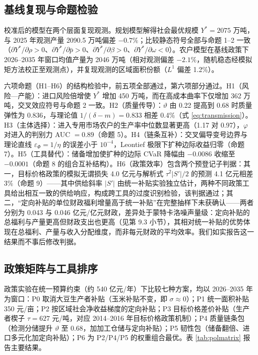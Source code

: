 \documentclass[UTF8,zihao=-4,fontset=fandol]{ctexart}
\numberwithin{equation}{section}
\theoremstyle{definition}
\theoremstyle{remark}
\begin{document}
\subsection{基线复现与命题检验}

校准后的模型在两个层面复现观测。规划模型解得社会最优规模 $Y^*=2075$ 万吨，与 2025 年观测产量 2090.5 万吨偏差 $-0.7\%$；比较静态符号全部与命题 1--2 一致（$\partial Y^*/\partial\rho>0$、$\partial Y^*/\partial\bar p>0$、$\partial Y^*/\partial\beta>0$、$\partial Y^*/\partial\omega<0$）。农户模型在基线政策下 2026--2035 年窗口均值产量为 2046 万吨（相对观测偏差 $-2.1\%$，随机稳态经模拟矩方法校正至观测点），并复现观测的区域面积份额（$L^1$ 偏差 1.2\%）。

六项命题（H1--H6）的结构检验中，前五项全部通过，第六项部分通过。H1（风险—产能）：进口风险倍增使 $Y^*$ 增加 450 万吨，而在高成本曲率下仅增加 362 万吨，交叉效应符号与命题 2 一致。H2（质量传导）：$\vartheta$ 由 0.22 提高到 0.68 时质量弹性为 0.836，与理论值 $1/(\delta-m)=0.833$ 相差 0.4\%（式 \eqref{eq:transmission}）。H3（主体选择）：进入专用市场农户的生产率中位数显著更高（1.17 对 0.97），$\varphi$ 对进入的判别力 AUC $=0.89$（命题 5）。H4（链条互补）：交叉偏导变号边界与理论直线 $\varepsilon_\Phi=1/\eta$ 的误差小于 $10^{-4}$，Leontief 极限下扩种边际收益归零（命题 7）。H5（工具替代）：储备增加使扩种的边际 CVaR 降幅由 $-0.0086$ 收缩至 $-0.0001$（命题 8 的组合互补结构）。H6（政策效率）包含两个预登记子判据：其一，目标价格政策的模拟无谓损失 4.0 亿元与解析式 $\tau^2|S'|/2$ 的预测 4.1 亿元相差 3\%（命题 9）——其中供给斜率 $|S'|$ 由统一补贴实验独立估计，两种不同政策工具给出相互一致的供给响应，构成跨工具的过度识别检验，该判据通过；其二，“定向补贴的单位财政福利增量高于统一补贴”在完整抽样下未获确认——两者分别为 0.043 与 0.046 亿元/亿元财政，差异处于蒙特卡洛噪声量级：定向补贴的总福利与产量更高但财政支出也更高（见第 9.3 小节），其相对统一补贴的优势体现在总福利、产量与收入分配维度，而非每元财政的平均效率。我们如实报告这一结果而不事后修改判据。

\subsection{政策矩阵与工具排序}

政策实验在统一预算约束（约 540 亿元/年）下比较七种方案，均以 2026--2035 年为窗口：P0 取消大豆生产者补贴（玉米补贴不变，即 $\sigma\approx0$）；P1 统一面积补贴 350 元/亩；P2 按区域社会净收益梯度的定向补贴；P3 目标价格差价补贴（生产者楔子 $\tau=627$ 元/吨，对应 2014--2016 年目标价格政策机制）；P4 质量链条包（检测分储提升 $\vartheta$ 至 0.68，加加工仓储与定向补贴）；P5 韧性包（储备翻倍、进口多元化加定向补贴）；P6 为 P2/P4/P5 的权重组合最优。表 \ref{tab:polmatrix} 报告主要结果。
\end{document}
